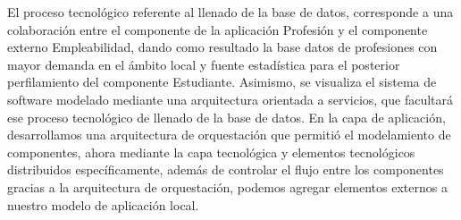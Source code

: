 El proceso tecnológico referente al llenado de la base de datos, corresponde a una colaboración entre el componente de la aplicación Profesión y el componente externo Empleabilidad, dando como resultado la base datos de profesiones con mayor demanda en el ámbito local y fuente estadística para el posterior perfilamiento del componente Estudiante. Asimismo, se visualiza el sistema de software modelado mediante una arquitectura orientada a servicios, que facultará ese proceso tecnológico de llenado de la base de datos. En la capa de aplicación, desarrollamos una arquitectura de orquestación que permitió el modelamiento de componentes, ahora mediante la capa tecnológica y elementos tecnológicos distribuidos específicamente, además de controlar el flujo entre los componentes gracias a la arquitectura de orquestación, podemos agregar elementos externos a nuestro modelo de aplicación local.